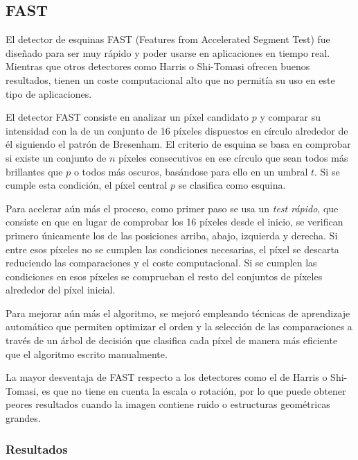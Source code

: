 
\subsection{FAST}

El detector de esquinas FAST (Features from Accelerated Segment Test) \cite{rosten2006fast} fue diseñado para ser muy rápido y poder usarse en aplicaciones en tiempo real. Mientras que otros detectores como Harris o Shi-Tomasi ofrecen buenos resultados, tienen un coste computacional alto que no permitía su uso en este tipo de aplicaciones.

El detector FAST consiste en analizar un píxel candidato \(p\) y comparar su intensidad con la de un conjunto de 16 píxeles dispuestos en círculo alrededor de él siguiendo el patrón de Bresenham. El criterio de esquina se basa en comprobar si existe un conjunto de \(n\) píxeles consecutivos en ese círculo que sean todos más brillantes que \(p\) o todos más oscuros, basándose para ello en un umbral \(t\). Si se cumple esta condición, el píxel central \(p\) se clasifica como esquina.

Para acelerar aún más el proceso, como primer paso se usa un \emph{test rápido}, que consiste en que en lugar de comprobar los 16 píxeles desde el inicio, se verifican primero únicamente los de las posiciones arriba, abajo, izquierda y derecha. Si entre esos píxeles no se cumplen las condiciones necesarias, el píxel se descarta reduciendo las comparaciones y el coste computacional. Si se cumplen las condiciones en esos píxeles se comprueban el resto del conjuntos de píxeles alrededor del píxel inicial.

Para mejorar aún más el algoritmo, se mejoró empleando técnicas de aprendizaje automático que permiten optimizar el orden y la selección de las comparaciones a través de un árbol de decisión que clasifica cada píxel de manera más eficiente que el algoritmo escrito manualmente.

La mayor desventaja de FAST respecto a los detectores como el de Harris o Shi-Tomasi, es que no tiene en cuenta la escala o rotación, por lo que puede obtener peores resultados cuando la imagen contiene ruido o estructuras geométricas grandes.

\subsubsection{Resultados}

